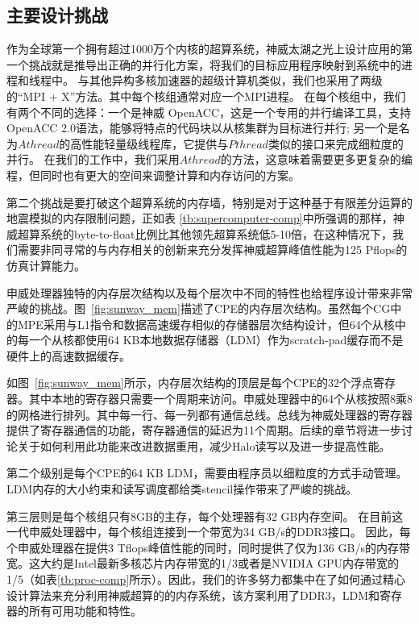 \documentclass[degree=doctor]{thuthesis}
\begin{document}
\subsection{主要设计挑战}
\label{sec:sunway-challenge}

作为全球第一个拥有超过1000万个内核的超算系统，神威太湖之光上设计应用的第一个挑战就是推导出正确的并行化方案，将我们的目标应用程序映射到系统中的进程和线程中。 与其他异构多核加速器的超级计算机类似，我们也采用了两级的“MPI + X”方法。其中每个核组通常对应一个MPI进程。 在每个核组中，我们有两个不同的选择：一个是神威 OpenACC，这是一个专用的并行编译工具，支持OpenACC 2.0语法，能够将特点的代码块以从核集群为目标进行并行; 另一个是名为$ Athread$的高性能轻量级线程库，它提供与$ Pthread $类似的接口来完成细粒度的并行。 在我们的工作中，我们采用$ Athread $的方法，这意味着需要更多更复杂的编程，但同时也有更大的空间来调整计算和内存访问的方案。

第二个挑战是要打破这个超算系统的内存墙，特别是对于这种基于有限差分运算的地震模拟的内存限制问题，正如表 \ref {tb:supercomputer-comp}中所强调的那样，神威超算系统的byte-to-float比例比其他领先超算系统低5-10倍，在这种情况下，我们需要非同寻常的与内存相关的创新来充分发挥神威超算峰值性能为125 Pflops的仿真计算能力。





申威处理器独特的内存层次结构以及每个层次中不同的特性也给程序设计带来非常严峻的挑战。图~\ref {fig:sunway_mem}描述了CPE的内存层次结构。虽然每个CG中的MPE采用与L1指令和数据高速缓存相似的存储器层次结构设计，但64个从核中的每一个从核都使用64 KB本地数据存储器（LDM）作为scratch-pad缓存而不是硬件上的高速数据缓存。


如图~\ref {fig:sunway_mem}所示，内存层次结构的顶层是每个CPE的32个浮点寄存器。其中本地的寄存器只需要一个周期来访问。申威处理器中的64个从核按照8乘8的网格进行排列。其中每一行、每一列都有通信总线。总线为神威处理器的寄存器提供了寄存器通信的功能，寄存器通信的延迟为11个周期。后续的章节将进一步讨论关于如何利用此功能来改进数据重用，减少Halo读写以及进一步提高性能。

第二个级别是每个CPE的64 KB LDM，需要由程序员以细粒度的方式手动管理。LDM内存的大小约束和读写调度都给类stencil操作带来了严峻的挑战。

第三层则是每个核组只有8GB的主存，每个处理器有32 GB内存空间。 在目前这一代申威处理器中，每个核组连接到一个带宽为34 GB/s的DDR3接口。 因此，每个申威处理器在提供3 Tflops峰值性能的同时，同时提供了仅为136 GB/s的内存带宽。这大约是Intel最新多核芯片内存带宽的1/3或者是NVIDIA GPU内存带宽的1/5（如表\ref {tb:proc-comp}所示）。因此，我们的许多努力都集中在了如何通过精心设计算法来充分利用神威超算的的内存系统，该方案利用了DDR3，LDM和寄存器的所有可用功能和特性。
\end{document}
